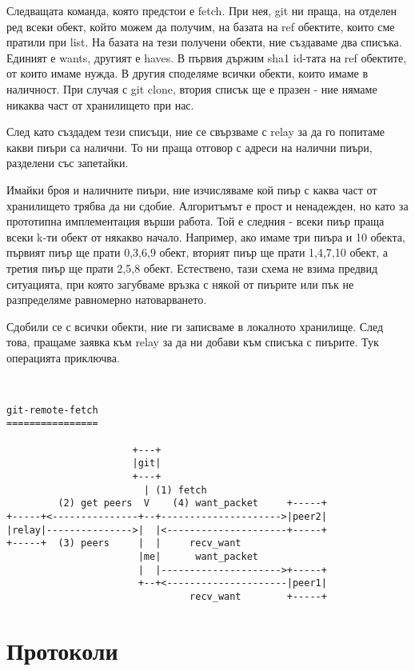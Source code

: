 \documentclass[a4paper,12pt]{article}
\begin{document}
Следващата команда, която предстои е fetch. При нея, git ни праща, на отделен ред
всеки обект, който можем да получим, на базата на ref обектите, които сме пратили
при list. На базата на тези получени обекти, ние създаваме два списъка. Единият
е wants, другият е haves. В първия държим sha1 id-тата на ref обектите, от които
имаме нужда. В другия споделяме всички обекти, които имаме в наличност. При
случая с git clone, втория списък ще е празен - ние нямаме никаква част от 
хранилището при нас.

След като създадем тези списъци, ние се свързваме с relay за да го попитаме
какви пиъри са налични. То ни праща отговор с адреси на налични пиъри, разделени
със запетайки.

Имайки броя и наличните пиъри, ние изчисляваме кой пиър с каква част от
хранилището трябва да ни сдобие. Алгоритъмът е прост и ненадежден, но като за 
прототипна имплементация върши работа. Той е следния - всеки пиър праща всеки
k-ти обект от някакво начало. Например, ако имаме три пиъра и 10 обекта, първият
пиър ще прати 0,3,6,9 обект, вторият пиър ще прати 1,4,7,10 обект, а третия пиър
ще прати 2,5,8 обект. Естествено, тази схема не взима предвид ситуацията, при
която загубваме връзка с някой от пиърите или пък не разпределяме равномерно
натоварването.

Сдобили се с всички обекти, ние ги записваме в локалното хранилище. След това,
пращаме заявка към relay за да ни добави към списъка с пиърите. Тук операцията
приключва.

\begin{verbatim}


git-remote-fetch
================

                      +---+             
                      |git|             
                      +---+             
                        | (1) fetch
         (2) get peers  V    (4) want_packet     +-----+
+-----+<---------------+--+--------------------->|peer2|
|relay|--------------->|  |<---------------------+-----+
+-----+  (3) peers     |  |     recv_want        
                       |me|      want_packet
                       |  |--------------------->+-----+
                       +--+<---------------------|peer1|
                                recv_want        +-----+

\end{verbatim}

\section{Протоколи}
\end{document}
